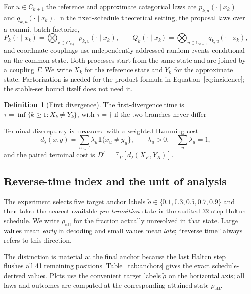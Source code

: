 \documentclass[11pt,a4paper]{article}
\theoremstyle{plain}
\theoremstyle{definition}
\newtheorem{definition}[theorem]{Definition}
\theoremstyle{remark}
\newcommand{\Ind}[1]{\mathbf{1}\{#1\}}
\newcommand{\Ex}{\mathbb{E}}
\newcommand{\rholabel}{\widetilde{\rho}}
\newcommand{\rhoatt}{\rho_{\mathrm{att}}}
\begin{document}
For $u \in C_{k+1}$ the reference and approximate categorical laws are
$p_{k,u}(\cdot \mid x_k)$ and $q_{k,u}(\cdot \mid x_k)$. In the fixed-schedule
theoretical setting, the proposal laws over a commit batch factorize,
\[
  P_k(\cdot\mid x_k)=\bigotimes_{u\in C_{k+1}}p_{k,u}(\cdot\mid x_k),
  \qquad
  Q_k(\cdot\mid x_k)=\bigotimes_{u\in C_{k+1}}q_{k,u}(\cdot\mid x_k),
\]
and coordinate couplings use independently addressed random events conditional
on the common state. Both processes start from the same state and are joined by
a coupling $\Gamma$. We write $X_k$ for the reference state and $Y_k$ for the
approximate state. Factorization is needed for the product formula in
Equation~\eqref{eq:incidence}; the stable-set bound itself does not need it.

\begin{definition}[First divergence]
\label{def:tau}
The first-divergence time is $\tau = \inf\{k \ge 1 : X_k \neq Y_k\}$, with
$\tau = \dagger$ if the two branches never differ.
\end{definition}

Terminal discrepancy is measured with a weighted Hamming cost
\[
  d_\lambda(x,y) = \sum_{u \in I} \lambda_u \Ind{x_u \neq y_u},
  \qquad \lambda_u > 0, \quad \textstyle\sum_u \lambda_u = 1 ,
\]
and the paired terminal cost is $D^\Gamma = \Ex_\Gamma[d_\lambda(X_K,Y_K)]$.

\subsection{Reverse-time index and the unit of analysis}
\label{sec:rho}
The experiment selects five target anchor labels
$\rholabel\in\{0.1,0.3,0.5,0.7,0.9\}$ and then takes the nearest available
\emph{pre-transition} state in the audited 32-step Halton schedule. We write
$\rhoatt$ for the fraction actually unresolved in that state. Large values mean
\emph{early} in decoding and small values mean \emph{late}; ``reverse time''
always refers to this direction.

The distinction is material at the final anchor because the last Halton step
flushes all 41 remaining positions. Table~\ref{tab:anchors} gives the exact
schedule-derived values. Plots use the convenient target labels $\rholabel$ on
the horizontal axis; all laws and outcomes are computed at the corresponding
attained state $\rhoatt$.
\end{document}
